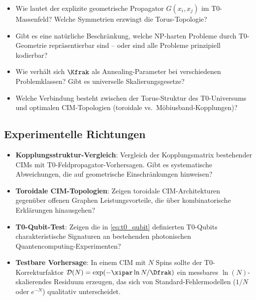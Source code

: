\begin{itemize}
    \item Wie lautet der explizite geometrische Propagator $G(x_i, x_j)$ 
    im T0-Massenfeld? Welche Symmetrien erzwingt die Torus-Topologie?
    
    \item Gibt es eine natürliche Beschränkung, welche NP-harten Probleme 
    durch T0-Geometrie repräsentierbar sind -- oder sind alle Probleme 
    prinzipiell kodierbar?
    
    \item Wie verhält sich $\Kfrak$ als Annealing-Parameter bei verschiedenen 
    Problemklassen? Gibt es universelle Skalierungsgesetze?
    
    \item Welche Verbindung besteht zwischen der Torus-Struktur des T0-Universums 
    und optimalen CIM-Topologien (toroidale vs.\ Möbiusband-Kopplungen)?
\end{itemize}

\subsection{Experimentelle Richtungen}

\begin{itemize}
    \item \textbf{Kopplungsstruktur-Vergleich}: Vergleich der Kopplungsmatrix 
    bestehender CIMs mit T0-Feldpropagator-Vorhersagen. Gibt es systematische 
    Abweichungen, die auf geometrische Einschränkungen hinweisen?
    
    \item \textbf{Toroidale CIM-Topologien}: Zeigen toroidale CIM-Architekturen 
    gegenüber offenen Graphen Leistungsvorteile, die über kombinatorische 
    Erklärungen hinausgehen?
    
    \item \textbf{T0-Qubit-Test}: Zeigen die in \eqref{eq:t0_qubit} definierten 
    T0-Qubits charakteristische Signaturen an bestehenden photonischen 
    Quantencomputing-Experimenten?
    
    \item \textbf{Testbare Vorhersage}: In einem CIM mit $N$ Spins sollte der 
    T0-Korrekturfaktor $\mathcal{D}(N) = \exp(-\xipar \ln N / \Dfrak)$ ein 
    messbares $\ln(N)$-skalierendes Residuum erzeugen, das sich von 
    Standard-Fehlermodellen ($1/N$ oder $e^{-N}$) qualitativ unterscheidet.
\end{itemize}

